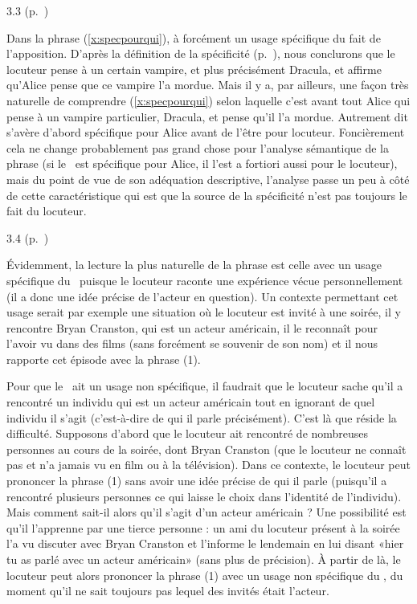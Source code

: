 \begin{Solution}{3.{3}}
(p.~\pageref{exo:specdicto})\label{crg:specdicto}

Dans la phrase (\ref{x:specpourqui}),  à forcément un usage spécifique du fait de l'apposition.  D'après la définition de la spécificité (p.~\pageref{def:spécificité}), nous conclurons que le locuteur pense à un certain vampire, et plus précisément Dracula, et affirme qu'Alice pense que ce vampire l'a mordue.  Mais il y a, par ailleurs, une façon très naturelle de comprendre (\ref{x:specpourqui}) selon laquelle c'est avant tout Alice qui pense à un vampire particulier, Dracula, et pense qu'il l'a mordue.  Autrement dit  s'avère d'abord spécifique pour Alice avant de l'être pour locuteur.  Foncièrement cela ne change probablement pas grand chose pour l'analyse sémantique de la phrase (si le \GN\ est spécifique pour Alice, il l'est a fortiori aussi pour le locuteur), mais du point de vue de son adéquation descriptive,   l'analyse passe un peu à côté de cette caractéristique qui est que la source de la spécificité n'est pas toujours le fait du locuteur.
\end{Solution}
\begin{Solution}{3.{4}}
 (p.~\pageref{exo:Spec3}) \label{crg:Spec3}

Évidemment, la lecture la plus naturelle de la phrase est celle avec un usage spécifique du \GN\ puisque le locuteur raconte une expérience vécue personnellement (il a donc une idée précise de l'acteur en question).   Un contexte permettant cet usage serait par exemple une situation où le locuteur est invité à une soirée, il y rencontre Bryan Cranston, qui est un acteur américain, il le reconnaît pour l'avoir vu dans des films (sans forcément se souvenir de son nom) et il nous rapporte cet épisode avec la phrase (1).

Pour que le \GN\ ait un usage non spécifique, il faudrait que le locuteur sache qu'il a rencontré un individu qui est un acteur américain tout en ignorant de quel individu il s'agit (c'est-à-dire de qui il parle précisément).  C'est là que réside la difficulté.  Supposons d'abord que le locuteur ait rencontré de nombreuses personnes au cours de la soirée, dont Bryan Cranston (que le locuteur ne connaît pas et n'a jamais vu en film ou à la télévision).  Dans ce contexte, le locuteur peut prononcer la phrase (1) sans avoir une idée précise de qui il parle (puisqu'il a rencontré plusieurs personnes ce qui laisse le choix dans l'identité de l'individu).  Mais comment sait-il alors qu'il s'agit d'un acteur américain ?  Une possibilité est qu'il l'apprenne par une tierce personne : un ami du locuteur présent à la soirée l'a vu discuter avec Bryan Cranston et l'informe le lendemain en lui disant «hier tu as parlé avec un acteur américain» (sans plus de précision). À partir de là, le locuteur peut alors prononcer la phrase (1) avec un usage non spécifique du \GN, du moment qu'il ne sait toujours pas lequel des invités était l'acteur.
\end{Solution}
